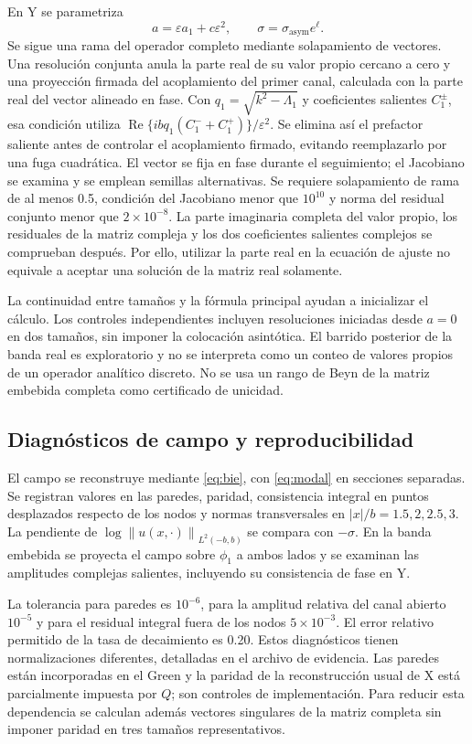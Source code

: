 \documentclass[11pt]{article}
\newcommand{\eps}{\varepsilon}
\newcommand{\norm}[1]{\left\lVert#1\right\rVert}
\begin{document}
En Y se parametriza
\begin{equation}
 a=\eps a_1+c\eps^2,\qquad
 \sigma=\sigma_{\mathrm{asym}}e^\ell.\label{eq:tuning}
\end{equation}
Se sigue una rama del operador completo mediante solapamiento de vectores. Una resolución conjunta anula la parte real de su valor propio cercano a cero y una proyección firmada del acoplamiento del primer canal, calculada con la parte real del vector alineado en fase. Con $q_1=\sqrt{k^2-\Lambda_1}$ y coeficientes salientes $C_1^\pm$, esa condición utiliza $\operatorname{Re}\{ibq_1(C_1^-+C_1^+)\}/\eps^2$. Se elimina así el prefactor saliente antes de controlar el acoplamiento firmado, evitando reemplazarlo por una fuga cuadrática. El vector se fija en fase durante el seguimiento; el Jacobiano se examina y se emplean semillas alternativas. Se requiere solapamiento de rama de al menos 0.5, condición del Jacobiano menor que $10^{10}$ y norma del residual conjunto menor que $2\times10^{-8}$. La parte imaginaria completa del valor propio, los residuales de la matriz compleja y los dos coeficientes salientes complejos se comprueban después. Por ello, utilizar la parte real en la ecuación de ajuste no equivale a aceptar una solución de la matriz real solamente.

La continuidad entre tamaños y la fórmula principal ayudan a inicializar el cálculo. Los controles independientes incluyen resoluciones iniciadas desde $a=0$ en dos tamaños, sin imponer la colocación asintótica. El barrido posterior de la banda real es exploratorio y no se interpreta como un conteo de valores propios de un operador analítico discreto. No se usa un rango de Beyn de la matriz embebida completa como certificado de unicidad.

\subsection{Diagnósticos de campo y reproducibilidad}
El campo se reconstruye mediante \eqref{eq:bie}, con \eqref{eq:modal} en secciones separadas. Se registran valores en las paredes, paridad, consistencia integral en puntos desplazados respecto de los nodos y normas transversales en $|x|/b=1.5,2,2.5,3$. La pendiente de $\log\norm{u(x,\cdot)}_{L^2(-b,b)}$ se compara con $-\sigma$. En la banda embebida se proyecta el campo sobre $\phi_1$ a ambos lados y se examinan las amplitudes complejas salientes, incluyendo su consistencia de fase en Y.

La tolerancia para paredes es $10^{-6}$, para la amplitud relativa del canal abierto $10^{-5}$ y para el residual integral fuera de los nodos $5\times10^{-3}$. El error relativo permitido de la tasa de decaimiento es 0.20. Estos diagnósticos tienen normalizaciones diferentes, detalladas en el archivo de evidencia. Las paredes están incorporadas en el Green y la paridad de la reconstrucción usual de X está parcialmente impuesta por $Q$; son controles de implementación. Para reducir esta dependencia se calculan además vectores singulares de la matriz completa sin imponer paridad en tres tamaños representativos.
\end{document}
